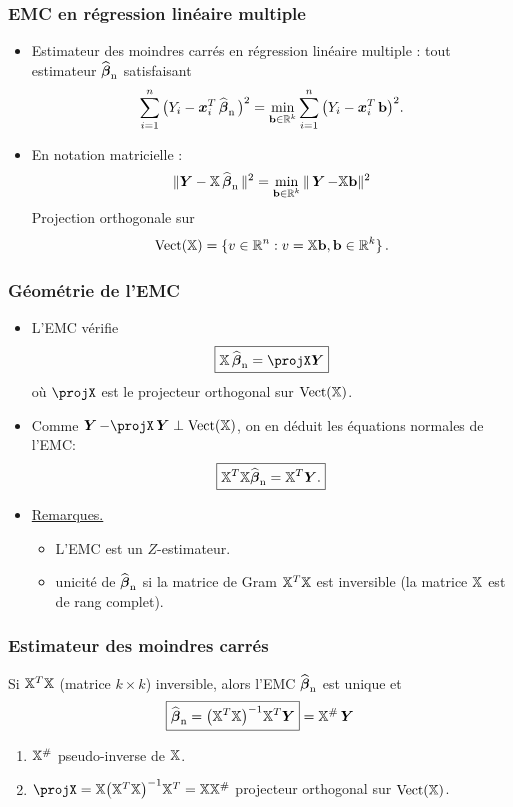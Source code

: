 \begin{frame}
\frametitle{EMC en régression linéaire multiple}
\begin{itemize}
\item Estimateur des \alert{moindres carrés} en régression
linéaire multiple : tout estimateur $\operatorname{\widehat{\boldsymbol{\beta}}_n}$ satisfaisant
$$\sum_{i = 1}^n
\big(Y_i- \operatorname{\boldsymbol{x}}_i^T \operatorname{\widehat{\boldsymbol{\beta}}_n} \big)^2 = \min_{\mathbf{b} \in \operatorname{{\mathbb R}}^k}\sum_{i =
1}^n \big(Y_i- \operatorname{\boldsymbol{x}}_i^T \mathbf{b}\big)^2.$$
\item En notation matricielle :
\[
\|\boldsymbol{Y}-\mathbb{X}\operatorname{\widehat{\boldsymbol{\beta}}_n}\|^2 =   \min_{\mathbf{b} \in \operatorname{{\mathbb R}}^k}\|\operatorname{\boldsymbol{Y}} -\mathbb{X}\mathbf{b}\|^2
\]
\alert{Projection orthogonale} sur 
$$
\mathrm{Vect}(\mathbb{X}) = \{v\in \operatorname{{\mathbb R}}^n: v=\mathbb{X} \mathbf{b}, \mathbf{b} \in \operatorname{{\mathbb R}}^k\} \,.
$$ 
\end{itemize}
\end{frame}


 \begin{frame}
\frametitle{Géométrie de l'EMC}
 \begin{itemize}
 \item L'EMC vérifie
$$\boxed{\regressmat \estregress = \projX \boldsymbol{Y}}$$
o\`u $\projX$ est le projecteur orthogonal sur $\mathrm{Vect}(\mathbb{X})$.
\item Comme $ \bY - \projX \bY \perp \vect(\regressmat)$, on en déduit \alert{les équations normales} de l'EMC:
$$\boxed{\mathbb{X}^T\mathbb{X} {\operatorname{\widehat{\boldsymbol{\beta}}_n}} =
\mathbb{X}^T\boldsymbol{Y}.}$$
\item \underline{Remarques.}
  \begin{itemize}
  \item L'EMC est un $Z$-estimateur.
  \item \alert{unicité} de $\operatorname{\widehat{\boldsymbol{\beta}}_n}$ si la matrice de Gram
  $\mathbb{X}^T\mathbb{X}$ est inversible (la matrice $\mathbb{X}$ est de rang complet).
  \end{itemize}
\end{itemize}
\end{frame}

\begin{frame} \frametitle{Estimateur des moindres carrés}
\begin{prop}
Si $\mathbb{X}^T\mathbb{X}$ (matrice $k \times k$) inversible, alors l'EMC
$\operatorname{\widehat{\boldsymbol{\beta}}_n}$ est \alert{unique} et
$$\boxed{\operatorname{\widehat{\boldsymbol{\beta}}_n} = \big(\mathbb{X}^T\mathbb{X}\big)^{-1}\mathbb{X}^T \boldsymbol{Y}}= \mathbb{X}^{\#} \operatorname{\boldsymbol{Y}}$$
\end{prop}
\begin{enumerate}
\item $\mathbb{X}^{\#}$ \alert{pseudo-inverse} de $\mathbb{X}$.
\item $\projX = \regressmat\big(\regressmat^T\regressmat\big)^{-1}\regressmat^T = \regressmat \regressmat^{\#}$ 
projecteur orthogonal sur $\mathrm{Vect}(\mathbb{X})$.
\end{enumerate}
\end{frame}


